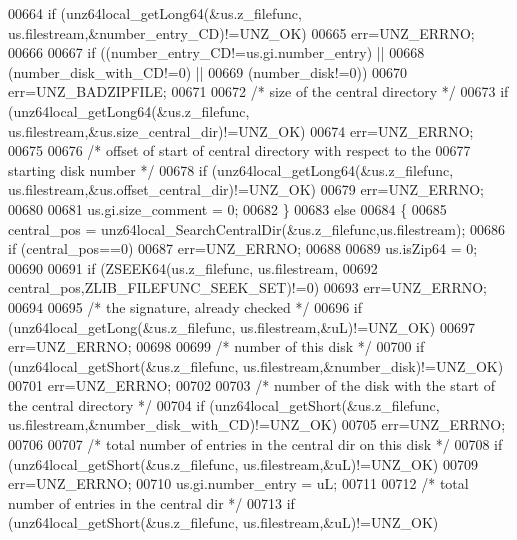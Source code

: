 \begin{DoxyCode}
00664         \textcolor{keywordflow}{if} (unz64local\_getLong64(&us.z\_filefunc, us.filestream,&number\_entry\_CD)!=UNZ\_OK)
00665             err=UNZ\_ERRNO;
00666 
00667         \textcolor{keywordflow}{if} ((number\_entry\_CD!=us.gi.number\_entry) ||
00668             (number\_disk\_with\_CD!=0) ||
00669             (number\_disk!=0))
00670             err=UNZ\_BADZIPFILE;
00671 
00672         \textcolor{comment}{/* size of the central directory */}
00673         \textcolor{keywordflow}{if} (unz64local\_getLong64(&us.z\_filefunc, us.filestream,&us.size\_central\_dir)!=UNZ\_OK)
00674             err=UNZ\_ERRNO;
00675 
00676         \textcolor{comment}{/* offset of start of central directory with respect to the}
00677 \textcolor{comment}{          starting disk number */}
00678         \textcolor{keywordflow}{if} (unz64local\_getLong64(&us.z\_filefunc, us.filestream,&us.offset\_central\_dir)!=UNZ\_OK)
00679             err=UNZ\_ERRNO;
00680 
00681         us.gi.size\_comment = 0;
00682     \}
00683     \textcolor{keywordflow}{else}
00684     \{
00685         central\_pos = unz64local\_SearchCentralDir(&us.z\_filefunc,us.filestream);
00686         \textcolor{keywordflow}{if} (central\_pos==0)
00687             err=UNZ\_ERRNO;
00688 
00689         us.isZip64 = 0;
00690 
00691         \textcolor{keywordflow}{if} (ZSEEK64(us.z\_filefunc, us.filestream,
00692                                         central\_pos,ZLIB\_FILEFUNC\_SEEK\_SET)!=0)
00693             err=UNZ\_ERRNO;
00694 
00695         \textcolor{comment}{/* the signature, already checked */}
00696         \textcolor{keywordflow}{if} (unz64local\_getLong(&us.z\_filefunc, us.filestream,&uL)!=UNZ\_OK)
00697             err=UNZ\_ERRNO;
00698 
00699         \textcolor{comment}{/* number of this disk */}
00700         \textcolor{keywordflow}{if} (unz64local\_getShort(&us.z\_filefunc, us.filestream,&number\_disk)!=UNZ\_OK)
00701             err=UNZ\_ERRNO;
00702 
00703         \textcolor{comment}{/* number of the disk with the start of the central directory */}
00704         \textcolor{keywordflow}{if} (unz64local\_getShort(&us.z\_filefunc, us.filestream,&number\_disk\_with\_CD)!=UNZ\_OK)
00705             err=UNZ\_ERRNO;
00706 
00707         \textcolor{comment}{/* total number of entries in the central dir on this disk */}
00708         \textcolor{keywordflow}{if} (unz64local\_getShort(&us.z\_filefunc, us.filestream,&uL)!=UNZ\_OK)
00709             err=UNZ\_ERRNO;
00710         us.gi.number\_entry = uL;
00711 
00712         \textcolor{comment}{/* total number of entries in the central dir */}
00713         \textcolor{keywordflow}{if} (unz64local\_getShort(&us.z\_filefunc, us.filestream,&uL)!=UNZ\_OK)

\end{DoxyCode}
